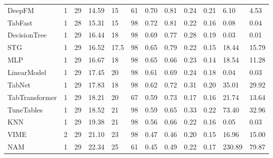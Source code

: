 \begin{tabular}{lllllrllllll}
DeepFM & 1 & 29 & 14.59 & 15 & 61 & 0.70 & 0.81 & 0.24 & 0.21 & 6.10 & 4.53 \\
TabFast & 1 & 28 & 15.31 & 15 & 98 & 0.72 & 0.81 & 0.22 & 0.16 & 0.08 & 0.04 \\
DecisionTree & 1 & 29 & 16.44 & 18 & 98 & 0.69 & 0.77 & 0.28 & 0.19 & 0.03 & 0.01 \\
STG & 1 & 29 & 16.52 & 17.5 & 98 & 0.65 & 0.79 & 0.22 & 0.15 & 18.44 & 15.79 \\
MLP & 1 & 29 & 16.67 & 18 & 98 & 0.65 & 0.66 & 0.23 & 0.14 & 18.54 & 11.28 \\
LinearModel & 1 & 29 & 17.45 & 20 & 98 & 0.61 & 0.69 & 0.24 & 0.18 & 0.04 & 0.03 \\
TabNet & 1 & 29 & 17.83 & 18 & 98 & 0.62 & 0.72 & 0.31 & 0.20 & 35.01 & 29.92 \\
TabTransformer & 1 & 29 & 18.21 & 20 & 67 & 0.59 & 0.73 & 0.17 & 0.16 & 21.74 & 13.64 \\
TuneTables & 1 & 29 & 18.52 & 21 & 98 & 0.59 & 0.65 & 0.33 & 0.22 & 73.40 & 32.96 \\
KNN & 1 & 29 & 19.38 & 21 & 98 & 0.56 & 0.66 & 0.22 & 0.16 & 0.05 & 0.03 \\
VIME & 2 & 29 & 21.10 & 23 & 98 & 0.47 & 0.46 & 0.20 & 0.15 & 16.96 & 15.00 \\
NAM & 1 & 29 & 22.34 & 25 & 61 & 0.45 & 0.49 & 0.22 & 0.17 & 230.89 & 79.87 \\
\bottomrule
\end{tabular}
